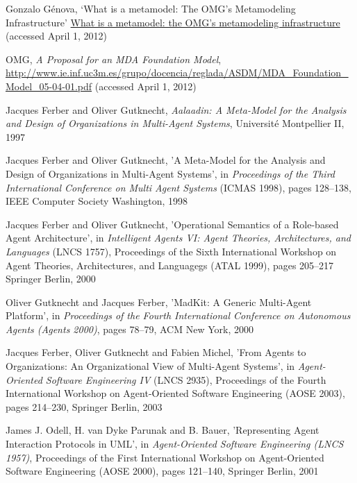 \begin{thebibliography}{99}
Gonzalo Génova,
`What is a metamodel: The OMG’s Metamodeling Infrastructure'
\url{What is a metamodel: the OMG’s metamodeling infrastructure} (accessed April 1, 2012)

OMG,
\textit{A Proposal for an MDA Foundation Model},
\url{http://www.ie.inf.uc3m.es/grupo/docencia/reglada/ASDM/MDA_Foundation_Model_05-04-01.pdf} (accessed April 1, 2012)


Jacques Ferber and Oliver Gutknecht,
\textit{Aalaadin: A Meta-Model for the Analysis and Design of Organizations in Multi-Agent Systems},
Université Montpellier II, 1997

Jacques Ferber and Oliver Gutknecht,
'A Meta-Model for the Analysis and Design of Organizations in Multi-Agent Systems',
in \textit{Proceedings of the Third International Conference on Multi Agent Systems} (ICMAS 1998),
pages 128--138, 
IEEE Computer Society Washington, 1998

Jacques Ferber and Oliver Gutknecht,
'Operational Semantics of a Role-based Agent Architecture',
in \textit{Intelligent Agents VI: Agent Theories, Architectures, and Languages} (LNCS 1757),
Proceedings of the Sixth International Workshop on Agent Theories, Architectures, and Languagegs (ATAL 1999),
pages 205--217
Springer Berlin, 2000

Oliver Gutknecht and Jacques Ferber,
'MadKit: A Generic Multi-Agent Platform',
in \textit{Proceedings of the Fourth International Conference on Autonomous Agents (Agents 2000)},
pages 78--79,
ACM New York, 2000

Jacques Ferber, Oliver Gutknecht and Fabien Michel,
'From Agents to Organizations: An Organizational View of Multi-Agent Systems',
in \textit{Agent-Oriented Software Engineering IV} (LNCS 2935),
Proceedings of the Fourth International Workshop on Agent-Oriented Software Engineering (AOSE 2003),
pages 214--230,
Springer Berlin, 2003


James J. Odell, H. van Dyke Parunak and B. Bauer,
'Representing Agent Interaction Protocols in UML',
in \textit{Agent-Oriented Software Engineering (LNCS 1957)},
Proceedings of the First International Workshop on Agent-Oriented Software Engineering (AOSE 2000),
pages 121--140,
Springer Berlin, 2001


\end{thebibliography}
